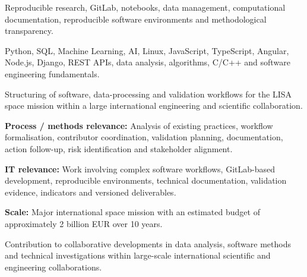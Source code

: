 \documentclass[8pt,a4paper,ragged2e,withhyper]{altacv}
\begin{document}
\divider


\small{Reproducible research, GitLab, notebooks, data management, computational documentation, reproducible software environments and methodological transparency.}

\divider


\divider


\small{Python, SQL, Machine Learning, AI, Linux, JavaScript, TypeScript, Angular, Node.js, Django, REST APIs, data analysis, algorithms, C/C++ and software engineering fundamentals.}



Structuring of software, data-processing and validation workflows for the LISA space mission within a large international engineering and scientific collaboration.

\textbf{Process / methods relevance:} Analysis of existing practices, workflow formalisation, contributor coordination, validation planning, documentation, action follow-up, risk identification and stakeholder alignment.

\textbf{IT relevance:} Work involving complex software workflows, GitLab-based development, reproducible environments, technical documentation, validation evidence, indicators and versioned deliverables.

\textbf{Scale:} Major international space mission with an estimated budget of approximately 2 billion EUR over 10 years.

\divider


Contribution to collaborative developments in data analysis, software methods and technical investigations within large-scale international scientific and engineering collaborations.
\end{document}
